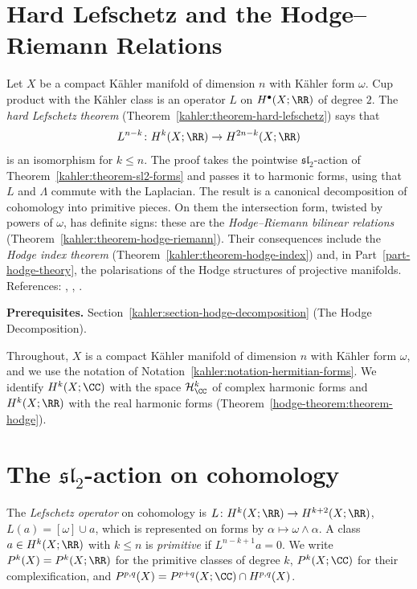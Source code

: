 \section{Hard Lefschetz and the Hodge--Riemann Relations}\label{kahler:section-lefschetz-theorems}
Let $X$ be a compact K\"ahler manifold of dimension $n$ with K\"ahler form $\omega$. Cup product with the K\"ahler class is an operator
$L$ on $H^\bullet(X; \RR)$ of degree $2$. The \emph{hard Lefschetz theorem}
(Theorem~\ref{kahler:theorem-hard-lefschetz}) says that
\[
L^{n-k} \colon H^k(X; \RR) \to H^{2n-k}(X; \RR)
\]
is an isomorphism for $k \leq n$. The proof takes the pointwise $\mathfrak{sl}_2$-action of Theorem~\ref{kahler:theorem-sl2-forms} and
passes it to harmonic forms, using that $L$ and $\Lambda$ commute with the Laplacian. The result is a canonical decomposition of cohomology
into primitive pieces. On them the intersection form, twisted by powers of $\omega$, has definite signs: these are the
\emph{Hodge--Riemann bilinear relations} (Theorem~\ref{kahler:theorem-hodge-riemann}). Their consequences include the
\emph{Hodge index theorem} (Theorem~\ref{kahler:theorem-hodge-index}) and, in Part~\ref{part-hodge-theory}, the polarisations of
the Hodge structures of projective manifolds. References: \cite[Chapter 0, Section 7]{griffiths-harris}, \cite[Section 3.3]{huybrechts-complex},
\cite[Chapter 6]{voisin-hodge-1}.

\noindent\textbf{Prerequisites.} Section~\ref{kahler:section-hodge-decomposition} (The Hodge Decomposition).

Throughout, $X$ is a compact K\"ahler manifold of dimension $n$ with K\"ahler form $\omega$, and we use the notation of
Notation~\ref{kahler:notation-hermitian-forms}. We identify $H^k(X; \CC)$ with the space $\mathcal{H}^k_\CC$ of complex
harmonic forms and $H^k(X; \RR)$ with the real harmonic forms (Theorem~\ref{hodge-theorem:theorem-hodge}).

\section{The $\mathfrak{sl}_2$-action on cohomology}\label{kahler:section-sl2-cohomology}

\begin{definition}\label{kahler:definition-lefschetz-cohomology}
The \emph{Lefschetz operator} on cohomology is $L \colon H^k(X; \RR) \to H^{k+2}(X; \RR)$, $L(a) = [\omega] \cup a$, which is
represented on forms by $\alpha \mapsto \omega \wedge \alpha$. A class $a \in H^k(X; \RR)$ with $k \leq n$ is \emph{primitive} if
$L^{n-k+1}a = 0$. We write $P^k(X) = P^k(X; \RR)$ for the primitive classes of degree $k$, $P^k(X; \CC)$ for their complexification,
and $P^{p,q}(X) = P^{p+q}(X; \CC) \cap H^{p,q}(X)$.
\end{definition}

